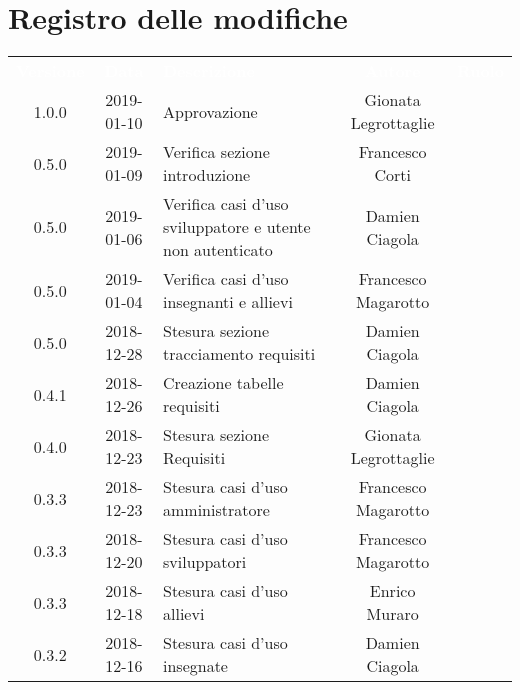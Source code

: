 \section*{Registro delle modifiche}
{
	\renewcommand{\arraystretch}{1.5}
	\centering
	\begin{longtable}{ c c C{6cm} c c }
		\textcolor{white}{\textbf{Versione}} & \textcolor{white}{\textbf{Data}} & \textcolor{white}{\textbf{Descrizione}} & \textcolor{white}{\textbf{Autore}} & \textcolor{white}{\textbf{Ruolo}}\\

		1.0.0 &
		2019-01-10 &
		Approvazione &	
		Gionata Legrottaglie&	
		\Res{} \\
		
		0.5.0 & 
		2019-01-09 &  
		Verifica sezione introduzione &	
		Francesco Corti&	
		\ver{} \\
		
		0.5.0 & 
		2019-01-06 &  
		Verifica casi d'uso sviluppatore e utente non autenticato& 	
		Damien Ciagola  &	
		\ver{} \\
		
		0.5.0 & 
		2019-01-04 &  
		Verifica casi d'uso insegnanti e allievi & 
		Francesco Magarotto  &
		\ver{}  \\
		
		0.5.0 & 
		2018-12-28 &  
		Stesura sezione tracciamento requisiti &	
		Damien Ciagola &	
		\ana{} \\
		
		0.4.1 & 
		2018-12-26 &  
		Creazione tabelle requisiti&	
		Damien Ciagola &	
		\ana{} \\
		
		0.4.0 & 
		2018-12-23 &  
		Stesura sezione Requisiti &	
		Gionata Legrottaglie &	
		\ana{} \\
		
		0.3.3 & 
		2018-12-23 &  
		Stesura casi d'uso amministratore &	
		Francesco Magarotto &	
		\ana{} \\
		
		0.3.3 & 
		2018-12-20 &  
		Stesura casi d'uso sviluppatori &	
		Francesco Magarotto &	
		\ana{} \\
		
		0.3.3 & 
		2018-12-18 &  
		Stesura casi d'uso allievi &	
		Enrico Muraro	&	
		\ana{} \\
		
		0.3.2 & 
		2018-12-16 &  
		Stesura casi d'uso insegnate &	
		Damien Ciagola &	
		\ana{} \\	
		

\end{longtable}}
